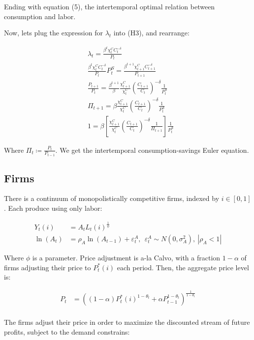 \documentclass[12pt]{article}
\begin{document}
Ending with equation (5), the intertemporal optimal relation between consumption and labor.

Now, lets plug the expression for $\lambda_t$ into (H3), and rearrange:

\begin{align*}
    &\lambda_t = \frac{\beta^t\chi_t^C C_t^{-\delta}}{P_t}\\
    &\frac{\beta^t\chi_t^C C_t^{-\delta}}{P_t}P^S_t  = \frac{\beta^{t+1}\chi_{t+1}^C C_{t+1}^{-\delta}}{P_{t+1}}\\
    &\frac{P_{t+1}}{P_t} = \frac{\beta^{t+1}}{\beta}\frac{\chi_{t+1}^C}{\chi_t^C} \left(\frac{C_{t+1}}{C_t}\right)^{-\delta}\frac{1}{P_t^S}\\
    &\Pi_{t+1} = \beta\frac{\chi_{t+1}^C}{\chi_t^C} \left(\frac{C_{t+1}}{C_t}\right)^{-\delta}\frac{1}{P_t^S}\\
    & 1 = \beta\left[\frac{\chi_{t+1}^C}{\chi_t^C} \left(\frac{C_{t+1}}{C_t}\right)^{-\delta}\frac{1}{\Pi_{t+1}}\right]\frac{1}{P_t^S} \tag{4}
\end{align*}

Where $\Pi_t \coloneqq \frac{P_t}{P_{t-1}}$. We get the intertemporal consumption-savings Euler equation.



\subsection{Firms}

There is a continuum of monopolistically competitive firms, indexed by $i \in [0,1]$. Each produce using only labor:

\begin{align*}
    Y_t(i) &= A_tL_t(i)^{\frac{1}{\phi}}\\
    \ln(A_t) &= \rho_A\ln(A_{t-1}) + \varepsilon_t^A, ~~ \varepsilon_t^A \sim N(0, \sigma^2_A),~ |\rho_A < 1| \tag{6}
\end{align*}

Where $\phi$ is a parameter. Price adjustment is a-la Calvo, with a fraction $1 - \alpha$ of firms adjusting their price to $P^*_t(i)$ each period. Then, the aggregate price level is: %

\begin{align*}
    P_t &= \left((1-\alpha)P^*_t(i)^{1-\theta_t} + \alpha P_{t-1}^{1-\theta_t}\right)^\frac{1}{1-\theta_t}\\
\end{align*}

The firms adjust their price in order to maximize the discounted stream of future profits, subject to the demand constrains:
\end{document}
